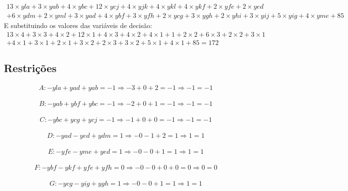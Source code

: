 \documentclass[a4paper]{report}
\begin{document}
\begin{multline}
13\times yla + 3\times yab + 4\times ybc + 12\times ycj + 4\times
yjk + 4\times ykl + 4\times ykf + 2\times yfe + 2\times yed \\ + 6\times ydm +
2\times yml + 3\times yad + 4\times ybf + 3\times yfh + 2\times ycg +
3\times ygh + 2\times yhi + 3\times yij + 5\times yig + 4\times yme + 85
\end{multline}
E substituindo os valores das variáveis de decisão:
\begin{multline}
13\times 4 + 3\times 3 + 4\times 2 + 12\times 1 + 4\times
3 + 4\times 2 + 4\times 1 + 1 + 2\times 2 + 6\times 3 +
2\times 2 + 3\times 1 \\ + 4\times 1 + 3\times 1 + 2\times 1 +
3\times 2 + 2\times 3 + 3\times 2 + 5\times 1 + 4\times 1 + 85
= 172
\end{multline}

\subsection{Restrições}
\begin{multline}
A: - yla + yad + yab = -1
\Rightarrow - 3 + 0 + 2 = -1 
\Rightarrow -1 = -1
\end{multline}

\begin{multline}
B: - yab + ybf + ybc = -1
\Rightarrow - 2 + 0 + 1 = -1
\Rightarrow -1 = -1
\end{multline}

\begin{multline}
C: - ybc + ycg + ycj = -1
\Rightarrow - 1 + 0 + 0 = -1
\Rightarrow -1 = -1
\end{multline}

\begin{multline}
D: - yad - yed + ydm = 1
\Rightarrow - 0 - 1 + 2 = 1
\Rightarrow 1 = 1
\end{multline}

\begin{multline}
E: - yfe - yme + yed = 1
\Rightarrow - 0 - 0 + 1 = 1
\Rightarrow 1 = 1
\end{multline}

\begin{multline}
F: - ybf - ykf + yfe + yfh = 0
\Rightarrow - 0 - 0 + 0 + 0 = 0
\Rightarrow 0 = 0
\end{multline}

\begin{multline}
G: - ycg - yig + ygh = 1
\Rightarrow - 0 - 0 + 1 = 1
\Rightarrow 1 = 1
\end{multline}
\end{document}
